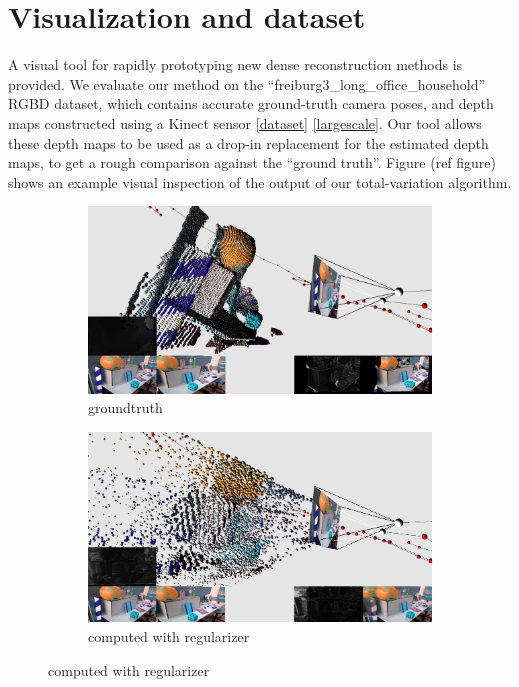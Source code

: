 \documentclass[conference]{IEEEtran}
\begin{document}


\section{Visualization and dataset}
A visual tool for rapidly prototyping new dense reconstruction methods is provided.
We evaluate our method on the ``freiburg3\_long\_office\_household'' RGBD dataset, which contains accurate ground-truth camera poses, and
depth maps constructed using a Kinect sensor \ref{dataset} \ref{largescale}. Our tool allows these depth maps to be used as a drop-in replacement for the estimated
depth maps, to get a rough comparison against the ``ground truth''. Figure (ref figure) shows an example visual inspection of the output
of our total-variation algorithm.

\begin{figure}[htbp]
\begin{subfigure}[b]{0.5\textwidth}
\centerline{\includegraphics[width=\textwidth]{figures/cloud_groundtruth.png}}
\caption{groundtruth}
\label{cloud_groundtruth}
\end{subfigure}
\begin{subfigure}[b]{0.5\textwidth}
\centerline{\includegraphics[width=\textwidth]{figures/cloud_computed.png}}
\caption{computed with regularizer}
\label{cloud_computed}
\end{subfigure}
\end{figure}
\end{document}
